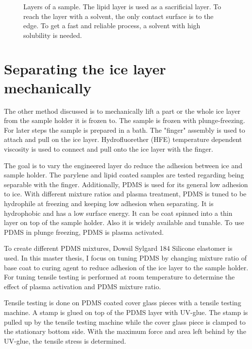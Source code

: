 \begin{figure}[hbt!]
	\centering
	
	\caption{Layers of a sample. The lipid layer is used as a sacrificial layer. To reach the layer with a solvent, the only contact surface is to the edge. To get a fast and reliable process, a solvent with high solubility is needed.}
	\label{fig:sacrificial layer}
\end{figure}

\section{Separating the ice layer mechanically}

The other method discussed is to mechanically lift a part or the whole ice layer from the sample holder it is frozen to. The sample is frozen with plunge-freezing. For later steps the sample is prepared in a bath. The "finger" assembly is used to attach and pull on the ice layer. Hydrofluorether (HFE) temperature dependent viscosity is used to connect and pull onto the ice layer with the finger.

The goal is to vary the engineered layer do reduce the adhesion between ice and sample holder. The parylene and lipid coated samples are tested regarding being separable with the finger. Additionally, PDMS is used for its general low adhesion to ice. With different mixture ratios and plasma treatment, PDMS is tuned to be hydrophile at freezing and keeping low adhesion when separating. It is hydrophobic and has a low surface energy. It can be coat spinned into a thin layer on top of the sample holder. Also it is widely available and tunable. To use PDMS in plunge freezing, PDMS is plasma activated.

To create different PDMS mixtures, Dowsil Sylgard 184 Silicone elastomer is used\cite{DOW.}. In this master thesis, I focus on tuning PDMS by changing mixture ratio of base coat to curing agent to reduce adhesion of the ice layer to the sample holder. For tuning tensile testing is performed at room temperature to determine the effect of plasma activation and PDMS mixture ratio.

Tensile testing is done on PDMS coated cover glass pieces with a tensile testing machine. A stamp is glued on top of the PDMS layer with UV-glue. The stamp is pulled up by the tensile testing machine while the cover glass piece is clamped to the stationary bottom side. With the maximum force and area left behind by the UV-glue, the tensile stress is determined.

